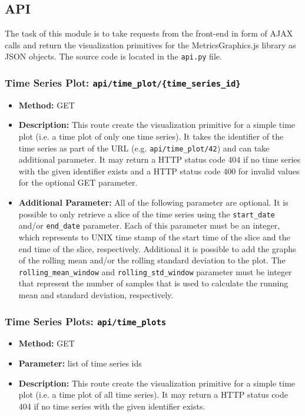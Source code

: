 \documentclass[11pt, a4paper]{article}
\begin{document}
\subsection{API}
The task of this module is to take requests from the front-end in form of AJAX calls and return the visualization primitives for the MetricsGraphics.js library as JSON objects.
The source code is located in the \texttt{api.py} file.

\subsubsection*{Time Series Plot: \texttt{api/time\_plot/\{time\_series\_id\}}}
\begin{itemize}
 \item[] \textbf{Method:} GET 
 \item[] \textbf{Description:} This route create the visualization primitive for a simple time plot (i.e. a time plot of only one time series).
 It takes the identifier of the time series as part of the URL (e.g. \texttt{api/time\_plot/42}) and can take additional parameter.
 It may return a HTTP status code 404 if no time series with the given identifier exists and a HTTP status code 400 for invalid values for the optional GET parameter.
 \item[] \textbf{Additional Parameter:} All of the following parameter are optional.
 It is possible to only retrieve a slice of the time series using the \texttt{start\_date} and/or \texttt{end\_date} parameter.
 Each of this parameter must be an integer, which represents to UNIX time stamp of the start time of the slice and the end time of the slice, respectively. 
 Additional it is possible to add the graphs of the rolling mean and/or the rolling standard deviation to the plot.
 The \texttt{rolling\_mean\_window} and \texttt{rolling\_std\_window} parameter must be integer that represent the number of samples that is used to calculate the running mean and standard deviation, respectively.
\end{itemize}


\subsubsection*{Time Series Plots: \texttt{api/time\_plots}}
\begin{itemize}
 \item[] \textbf{Method:} GET 
 \item[] \textbf{Parameter:} list of time series ids
 \item[] \textbf{Description:} This route create the visualization primitive for a simple time plot (i.e. a time plot of all time series).
 It may return a HTTP status code 404 if no time series with the given identifier exists.
\end{itemize}
\end{document}
